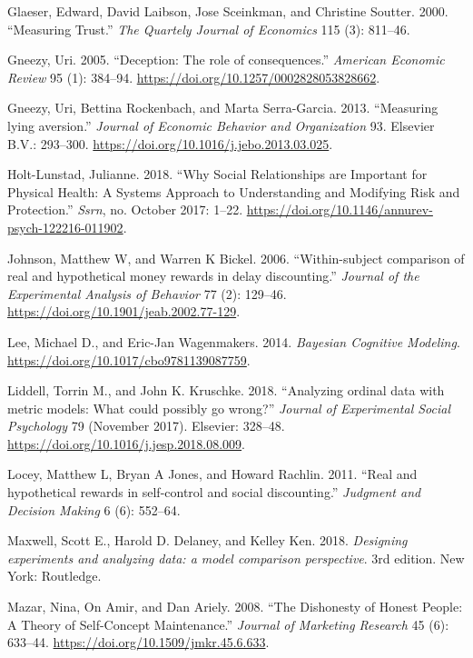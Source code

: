 \documentclass[smallextended]{svjour3}       %
\begin{document}
\leavevmode\hypertarget{ref-Glaeser2000}{}%
Glaeser, Edward, David Laibson, Jose Sceinkman, and Christine Soutter.
2000. ``Measuring Trust.'' \emph{The Quartely Journal of Economics} 115
(3): 811--46.

\leavevmode\hypertarget{ref-Gneezy2005}{}%
Gneezy, Uri. 2005. ``Deception: The role of consequences.''
\emph{American Economic Review} 95 (1): 384--94.
\url{https://doi.org/10.1257/0002828053828662}.

\leavevmode\hypertarget{ref-Gneezy2013}{}%
Gneezy, Uri, Bettina Rockenbach, and Marta Serra-Garcia. 2013.
``Measuring lying aversion.'' \emph{Journal of Economic Behavior and
Organization} 93. Elsevier B.V.: 293--300.
\url{https://doi.org/10.1016/j.jebo.2013.03.025}.

\leavevmode\hypertarget{ref-Holt-Lunstad2018}{}%
Holt-Lunstad, Julianne. 2018. ``Why Social Relationships are Important
for Physical Health: A Systems Approach to Understanding and Modifying
Risk and Protection.'' \emph{Ssrn}, no. October 2017: 1--22.
\url{https://doi.org/10.1146/annurev-psych-122216-011902}.

\leavevmode\hypertarget{ref-Johnson2006}{}%
Johnson, Matthew W, and Warren K Bickel. 2006. ``Within-subject
comparison of real and hypothetical money rewards in delay
discounting.'' \emph{Journal of the Experimental Analysis of Behavior}
77 (2): 129--46. \url{https://doi.org/10.1901/jeab.2002.77-129}.

\leavevmode\hypertarget{ref-Lee2014}{}%
Lee, Michael D., and Eric-Jan Wagenmakers. 2014. \emph{Bayesian
Cognitive Modeling}. \url{https://doi.org/10.1017/cbo9781139087759}.

\leavevmode\hypertarget{ref-Liddell2018}{}%
Liddell, Torrin M., and John K. Kruschke. 2018. ``Analyzing ordinal data
with metric models: What could possibly go wrong?'' \emph{Journal of
Experimental Social Psychology} 79 (November 2017). Elsevier: 328--48.
\url{https://doi.org/10.1016/j.jesp.2018.08.009}.

\leavevmode\hypertarget{ref-Locey2011}{}%
Locey, Matthew L, Bryan A Jones, and Howard Rachlin. 2011. ``Real and
hypothetical rewards in self-control and social discounting.''
\emph{Judgment and Decision Making} 6 (6): 552--64.

\leavevmode\hypertarget{ref-Maxwell2018}{}%
Maxwell, Scott E., Harold D. Delaney, and Kelley Ken. 2018.
\emph{Designing experiments and analyzing data: a model comparison
perspective}. 3rd edition. New York: Routledge.

\leavevmode\hypertarget{ref-Mazar2008}{}%
Mazar, Nina, On Amir, and Dan Ariely. 2008. ``The Dishonesty of Honest
People: A Theory of Self-Concept Maintenance.'' \emph{Journal of
Marketing Research} 45 (6): 633--44.
\url{https://doi.org/10.1509/jmkr.45.6.633}.
\end{document}

